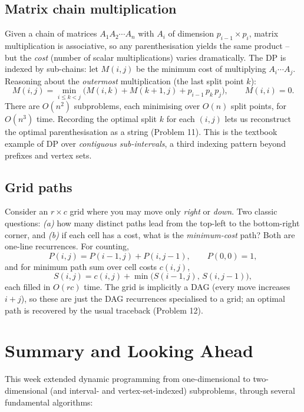 \documentclass[11pt]{article}
\begin{document}
\subsection{Matrix chain multiplication}

Given a chain of matrices $A_1 A_2 \cdots A_n$ with $A_i$ of dimension $p_{i-1} \times
p_i$, matrix multiplication is associative, so any parenthesisation yields the same product
-- but the \emph{cost} (number of scalar multiplications) varies dramatically. The DP is
indexed by sub-chains: let $M(i,j)$ be the minimum cost of multiplying $A_i \cdots A_j$.
Reasoning about the \emph{outermost} multiplication (the last split point $k$):
\[
M(i,j) = \min_{i \le k < j} \big( M(i,k) + M(k+1, j) + p_{i-1}\,p_k\,p_j \big),
\qquad M(i,i) = 0.
\]
There are $O(n^2)$ subproblems, each minimising over $O(n)$ split points, for $O(n^3)$ time.
Recording the optimal split $k$ for each $(i,j)$ lets us reconstruct the optimal
parenthesisation as a string (Problem 11). This is the textbook example of DP over
\emph{contiguous sub-intervals}, a third indexing pattern beyond prefixes and vertex sets.

\subsection{Grid paths}

Consider an $r \times c$ grid where you may move only \emph{right} or \emph{down}. Two
classic questions: \emph{(a)} how many distinct paths lead from the top-left to the
bottom-right corner, and \emph{(b)} if each cell has a cost, what is the
\emph{minimum-cost} path? Both are one-line recurrences. For counting,
\[
P(i,j) = P(i-1,j) + P(i,j-1), \qquad P(0,0) = 1,
\]
and for minimum path sum over cell costs $c(i,j)$,
\[
S(i,j) = c(i,j) + \min\big(S(i-1,j),\, S(i,j-1)\big),
\]
each filled in $O(rc)$ time. The grid is implicitly a DAG (every move increases $i+j$), so
these are just the DAG recurrences specialised to a grid; an optimal path is recovered by
the usual traceback (Problem 12).

\section{Summary and Looking Ahead}

This week extended dynamic programming from one-dimensional to two-dimensional (and
interval- and vertex-set-indexed) subproblems, through several fundamental algorithms:
\end{document}
